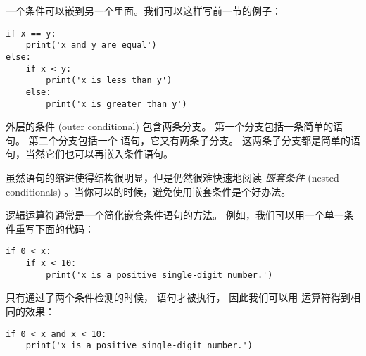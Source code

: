 {{{{%

一个条件可以嵌到另一个里面。我们可以这样写前一节的例子：

\begin{lstlisting}
if x == y:
    print('x and y are equal')
else:
    if x < y:
        print('x is less than y')
    else:
        print('x is greater than y')
\end{lstlisting}

%

外层的条件 (outer conditional) 包含两条分支。 第一个分支包括一条简单的语句。
第二个分支包括一个  语句，它又有两条子分支。
这两条子分支都是简单的语句，当然它们也可以再嵌入条件语句。



虽然语句的缩进使得结构很明显，但是仍然很难快速地阅读 {\em 嵌套条件} (nested conditionals) 。当你可以的时候，避免使用嵌套条件是个好办法。


逻辑运算符通常是一个简化嵌套条件语句的方法。
例如，我们可以用一个单一条件重写下面的代码：

\begin{lstlisting}
if 0 < x:
    if x < 10:
        print('x is a positive single-digit number.')
\end{lstlisting}

%

只有通过了两个条件检测的时候，  语句才被执行，
因此我们可以用  运算符得到相同的效果：


\begin{lstlisting}
if 0 < x and x < 10:
    print('x is a positive single-digit number.')
\end{lstlisting}

}}}}
